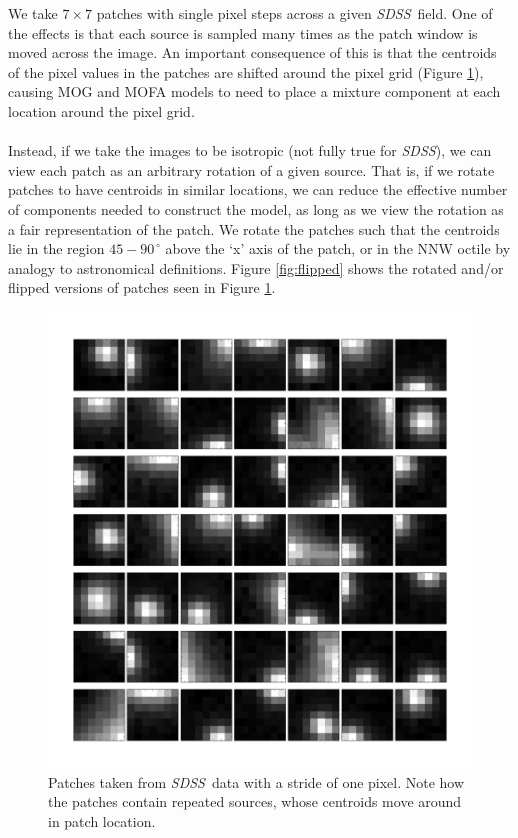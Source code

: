 \documentclass[letterpaper,12pt]{article}
\newcommand{\sdss}{{\it SDSS}}
\begin{document}
We take $7\times7$ patches with single pixel steps across a given \sdss\, field.  
One of the effects is that each source is sampled many times as the patch 
window is moved across the image.  An important consequence of this is that 
the centroids of the pixel values in the patches are shifted around the pixel grid
(Figure \ref{fig:unflipped}), causing MOG and MOFA models to need to place a 
mixture component at each location around the pixel grid.  
\\ \\
Instead, if we take the images to be isotropic (not fully true for \sdss), we can 
view each patch as an arbitrary rotation of a given source.  That is, if we rotate 
patches to have centroids in similar locations, we can reduce the effective 
number of components needed to construct the model, as long as we view the 
rotation as a fair representation of the patch.  We rotate the patches such that 
the centroids lie in the region $45-90^{\,\circ}$ above the `x' axis of the patch, 
or in the NNW octile by analogy to astronomical definitions.  Figure 
\ref{fig:flipped} shows the rotated and/or flipped versions of patches seen in 
Figure \ref{fig:unflipped}.

\begin{figure}
\includegraphics[clip=true, trim=0cm 0cm 0.0cm 0.cm,width=12cm]{figures/unflipped.pdf}
\caption{Patches taken from \sdss\, data with a stride of one pixel.  Note how 
the patches contain repeated sources, whose centroids move around in 
patch location.}
\label{fig:unflipped}
\end{figure}
\end{document}

